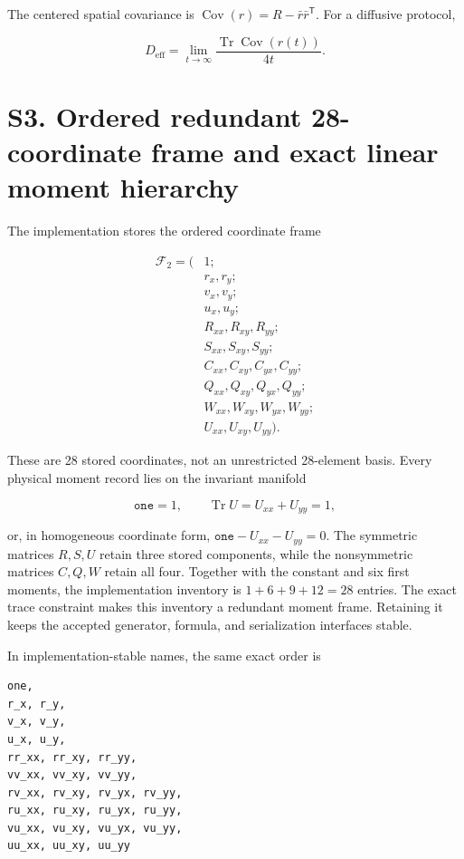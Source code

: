 The centered spatial covariance is \(\operatorname{Cov}(r)=R-\bar r\bar r^\mathsf T\). For a diffusive protocol,

\[
D_{\mathrm{eff}}
=\lim_{t\to\infty}\frac{\operatorname{Tr}\operatorname{Cov}(r(t))}{4t}.
\]

\section{S3. Ordered redundant 28-coordinate frame and exact linear moment hierarchy}\label{s3.-ordered-redundant-28-coordinate-frame-and-exact-linear-moment-hierarchy}

The implementation stores the ordered coordinate frame

\[
\begin{aligned}
\mathcal F_2=\big(&1;\\
&r_x,r_y;\\
&v_x,v_y;\\
&u_x,u_y;\\
&R_{xx},R_{xy},R_{yy};\\
&S_{xx},S_{xy},S_{yy};\\
&C_{xx},C_{xy},C_{yx},C_{yy};\\
&Q_{xx},Q_{xy},Q_{yx},Q_{yy};\\
&W_{xx},W_{xy},W_{yx},W_{yy};\\
&U_{xx},U_{xy},U_{yy}\big).
\end{aligned}
\]

These are 28 stored coordinates, not an unrestricted 28-element basis. Every physical moment record lies on the invariant manifold

\[
\boxed{\texttt{one}=1,\qquad
\operatorname{Tr}U=U_{xx}+U_{yy}=1,}
\]

or, in homogeneous coordinate form, \(\texttt{one}-U_{xx}-U_{yy}=0\). The symmetric matrices \(R,S,U\) retain three stored components, while the nonsymmetric matrices \(C,Q,W\) retain all four. Together with the constant and six first moments, the implementation inventory is \(1+6+9+12=28\) entries. The exact trace constraint makes this inventory a redundant moment frame. Retaining it keeps the accepted generator, formula, and serialization interfaces stable.

In implementation-stable names, the same exact order is

\begin{verbatim}
one,
r_x, r_y,
v_x, v_y,
u_x, u_y,
rr_xx, rr_xy, rr_yy,
vv_xx, vv_xy, vv_yy,
rv_xx, rv_xy, rv_yx, rv_yy,
ru_xx, ru_xy, ru_yx, ru_yy,
vu_xx, vu_xy, vu_yx, vu_yy,
uu_xx, uu_xy, uu_yy
\end{verbatim}

